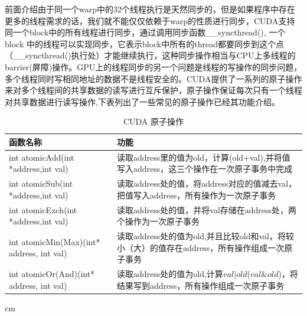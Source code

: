 前面介绍由于同一个warp中的32个线程执行是天然同步的，但是如果程序中存在更多的线程需求的话，我们就不能仅仅依赖于warp的性质进行同步，CUDA支持同一个block中的所有线程进行同步，通过调用同步函数\_\_syncthread(), 一个block 中的线程可以实现同步，它表示block中所有的thread都要同步到这个点（\_\_syncthread()执行处）才能继续执行，这种同步操作相当与CPU上多线程的barrier(屏障)操作。GPU上的线程同步的另一个问题是线程的写操作的同步问题，多个线程同时写相同地址的数据不是线程安全的。CUDA提供了一系列的原子操作来对多个线程间的共享数据的读写进行互斥保护，原子操作保证每次只有一个线程对共享数据进行读写操作,下表列出了一些常见的原子操作已经其功能介绍。
\begin{table}[t]
\newcommand{\tabincell}[2]{\begin{tabular}{@{}#1@{}}#2\end{tabular}}
\setlength{\abovecaptionskip}{0.2cm}
\scriptsize{
\caption{CUDA 原子操作}
\renewcommand{\tabcolsep}{0.09cm}
\renewcommand{\arraystretch}{0.8}
\centering
\begin{tabular}{|p{6cm}<{\centering}|p{6cm}<{\centering}|}
\hline 函数名称& 功能\\ \hline
int atomicAdd(int *address,int val)&读取address里的值为old，计算(old+val),并将值写入address，这三个操作在一次原子事务中完成\\ \hline
int atomicSub(int *address,int val)&读取address处的值，将address对应的值减去val，把值写入address，所有操作为一次原子事务\\ \hline
int atomicExch(int *address,int val)&读取address处的值，并将val存储在address处，两个操作为一次原子事务\\ \hline
int atomicMin(Max)(int* address, int val)&读取address处的值为old,并且比较old和val，将较小（大）的值存在address，所有操作组成一次原子事务\\ \hline
int atomicOr(And)(int* address, int val)&读取address处的值为old,计算$val|old$($val \& old$)，将结果写到address，所有操作组成一次原子事务\\ \hline
\end{tabular}
  cm
  \label{CY}
}
\end{table}
